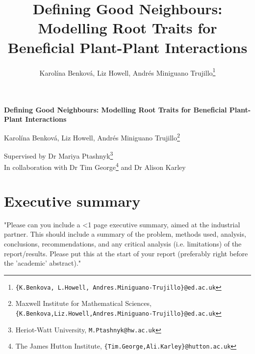 \documentclass[11pt]{article}
\title{\bf
    \Large
    Defining Good Neighbours: Modelling Root Traits for Beneficial Plant-Plant Interactions
}
\author{
    Karolína Benková, Liz Howell, Andrés Miniguano Trujillo\footnote{ \texttt{\{K.Benkova, L.Howell, Andres.Miniguano-Trujillo\}@ed.ac.uk} }
}
\date{}
\numberwithin{equation}{section}
\begin{document}
\begin{titlepage}
    \begin{center}
        \vspace*{2cm}
        
        \Huge
        \textbf{Defining Good Neighbours: Modelling Root Traits for Beneficial Plant-Plant Interactions}
        
            
        \vspace{1cm}
        
        \Large Karolína Benková, Liz Howell, Andrés Miniguano Trujillo\footnote{\normalsize Maxwell Institute for Mathematical Sciences,   \texttt{\{K.Benkova,Liz.Howell,Andres.Miniguano-Trujillo\}@ed.ac.uk}}
        
            
        \vspace{1.5cm}
            
        \Large
        Supervised by Dr Mariya Ptashnyk\footnote{\normalsize Heriot-Watt University, \texttt{M.Ptashnyk@hw.ac.uk}} \\ 
        In collaboration with Dr Tim George\footnote{\normalsize The James Hutton Institute, \texttt{\{Tim.George,Ali.Karley\}@hutton.ac.uk}} and Dr Alison Karley\textsuperscript{\small\ddag}

        \vfill
            
        
    \end{center}
\end{titlepage}
\newpage
{}

\section*{Executive summary}
"Please can you include a <1 page executive
summary, aimed at the industrial partner.  This should include a summary
of the problem, methods used, analysis, conclusions, recommendations,
and any critical analysis (i.e. limitations) of the report/results.
Please put this at the start of your report (preferably right before the
'academic' abstract)."


\end{document}
